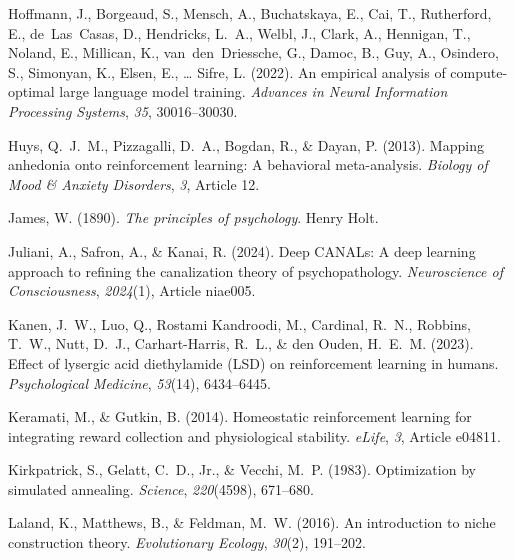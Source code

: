 \documentclass[12pt,fleqn]{article}
\begin{document}
\begin{thebibliography}{}
  Hoffmann, J., Borgeaud, S., Mensch, A., Buchatskaya, E., Cai, T., Rutherford, E., de~Las~Casas, D., Hendricks, L.~A., Welbl, J., Clark, A., Hennigan, T., Noland, E., Millican, K., van~den~Driessche, G., Damoc, B., Guy, A., Osindero, S., Simonyan, K., Elsen, E., \ldots{} Sifre, L. (2022).
  An empirical analysis of compute-optimal large language model training.
  \emph{Advances in Neural Information Processing Systems}, \emph{35}, 30016--30030.

  Huys, Q.~J.~M., Pizzagalli, D.~A., Bogdan, R., \& Dayan, P. (2013).
  Mapping anhedonia onto reinforcement learning: A behavioral meta-analysis.
  \emph{Biology of Mood \& Anxiety Disorders}, \emph{3}, Article 12.

  James, W. (1890).
  \emph{The principles of psychology}.
  Henry Holt.

  Juliani, A., Safron, A., \& Kanai, R. (2024).
  Deep CANALs: A deep learning approach to refining the canalization theory of psychopathology.
  \emph{Neuroscience of Consciousness}, \emph{2024}(1), Article niae005.

  Kanen, J.~W., Luo, Q., Rostami Kandroodi, M., Cardinal, R.~N., Robbins, T.~W., Nutt, D.~J., Carhart-Harris, R.~L., \& den Ouden, H.~E.~M. (2023).
  Effect of lysergic acid diethylamide (LSD) on reinforcement learning in humans.
  \emph{Psychological Medicine}, \emph{53}(14), 6434--6445.

  Keramati, M., \& Gutkin, B. (2014).
  Homeostatic reinforcement learning for integrating reward collection and physiological stability.
  \emph{eLife}, \emph{3}, Article e04811.

  Kirkpatrick, S., Gelatt, C.~D., Jr., \& Vecchi, M.~P. (1983).
  Optimization by simulated annealing.
  \emph{Science}, \emph{220}(4598), 671--680.

  Laland, K., Matthews, B., \& Feldman, M.~W. (2016).
  An introduction to niche construction theory.
  \emph{Evolutionary Ecology}, \emph{30}(2), 191--202.


\end{thebibliography}
\end{document}
